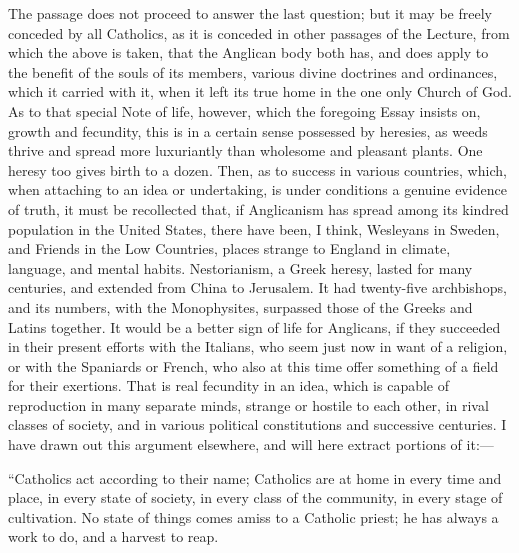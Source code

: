 The passage does not proceed to answer the last
question; but it may be freely conceded by all Catholics, as it is
conceded in other passages of the Lecture, from which the above is
taken, that the Anglican body both has, and does apply to the benefit
of the souls of its members, various divine doctrines and ordinances,
which it carried with it, when it left its true home in the one only
Church of God. As to that special Note of life, however, which the
foregoing Essay insists on, growth and fecundity, this is in a certain
sense possessed by heresies, as weeds thrive and spread more
luxuriantly than wholesome and pleasant plants. One heresy too gives
birth to a dozen. Then, as to success in various countries, which,
when attaching to an idea or undertaking, is under conditions a
genuine evidence of truth, it must be recollected that, if Anglicanism
has spread among its kindred population in the United States, there
have been, I think, Wesleyans in Sweden, and Friends in the Low
Countries, places strange to England in climate, language, and mental
habits. Nestorianism, a Greek heresy, lasted for many centuries, and
extended from China to Jerusalem. It had twenty-five archbishops, and
its numbers, with the Monophysites, surpassed those of the Greeks and
Latins together. It would be a better sign of life for Anglicans, if
they succeeded in their present efforts with the Italians, who seem
just now in want of a religion, or with the Spaniards or French, who
also at this time offer something of a field for their exertions. That
is real fecundity in an idea, which is capable of reproduction in many
separate minds, strange or hostile to each other, in rival classes of
society, and in various political constitutions and successive
centuries. I have drawn out this argument elsewhere, and will here
extract portions of it:—

``Catholics act according to their name; Catholics
are at home in every time and place, in every state of society, in
every class of the community, in every stage of cultivation. No state
of things comes amiss to a Catholic priest; he has always a work to
do, and a harvest to reap.


